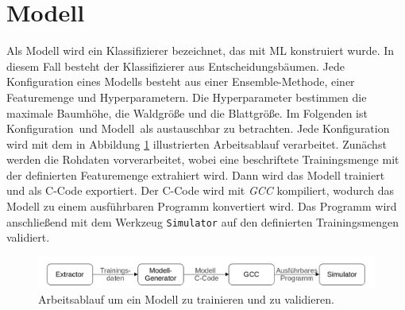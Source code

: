 \section{Modell}
Als Modell wird ein Klassifizierer bezeichnet, das mit ML konstruiert wurde. In diesem Fall besteht der Klassifizierer aus Entscheidungsbäumen. Jede Konfiguration eines Modells besteht aus einer
Ensemble-Methode, einer Featuremenge und Hyperparametern. Die Hyperparameter bestimmen die maximale Baumhöhe, die Waldgröße und die Blattgröße. Im Folgenden ist \glqq Konfiguration\grqq\ und \glqq Modell\grqq\
als austauschbar zu betrachten.
\newline
\newline
Jede Konfiguration wird mit dem in Abbildung \ref{fig:model_workflow} illustrierten Arbeitsablauf verarbeitet. Zunächst werden die Rohdaten vorverarbeitet, wobei eine beschriftete Trainingsmenge mit der definierten
Featuremenge extrahiert wird. Dann wird das Modell trainiert und als C-Code exportiert. Der C-Code wird mit \textit{GCC} kompiliert, wodurch das Modell zu einem ausführbaren Programm konvertiert wird. Das Programm
wird anschließend mit dem Werkzeug \texttt{Simulator} auf den definierten Trainingsmengen validiert.
\begin{figure}
    \centering
    \includegraphics[width=\linewidth]{images/model_workflow.jpg}
    \caption{Arbeitsablauf um ein Modell zu trainieren und zu validieren.}
    \label{fig:model_workflow}
\end{figure}

